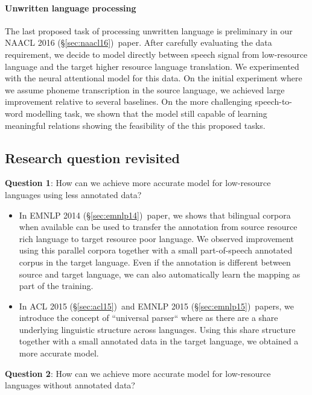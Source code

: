 \documentclass[12pt,twoside,final,hidelinks]{ltthesis}
\theoremstyle{definition}
\newcommand\emnlpiv{EMNLP 2014 (\S\ref{sec:emnlp14})}
\newcommand\aclv{ACL 2015 (\S\ref{sec:acl15})}
\newcommand\emnlpv{EMNLP 2015 (\S\ref{sec:emnlp15})}
\newcommand\naaclvi{NAACL 2016 (\S\ref{sec:naacl16})}
\begin{document}
\paragraph{Unwritten language processing}The last proposed task of processing unwritten language is preliminary in our \naaclvi\ paper. After carefully evaluating the data requirement, we decide 
to model directly between speech signal from low-resource language and the target higher resource language translation. We experimented with the neural attentional model 
for this data. On the initial experiment where we assume phoneme transcription in the source language, we achieved large improvement relative to several 
baselines. On the more challenging speech-to-word modelling task, we shown that the model still capable of learning meaningful relations showing the feasibility 
of the this proposed tasks. 

\subsection{Research question revisited}
\textbf{Question 1}: How can we achieve more accurate model for low-resource languages using less annotated data? 
\begin{itemize}
\item In \emnlpiv\ paper, we shows that bilingual corpora when available can be used to transfer the annotation from source resource rich language to target 
resource poor language. We observed improvement using this parallel corpora together with a small part-of-speech annotated corpus in the target language. Even if 
the annotation is different between source and target language, we can also automatically learn the mapping as part of the training. 
\item 	In \aclv\ and \emnlpv\ papers, we introduce the concept of ``universal parser`` where as there are a share underlying linguistic structure across languages. 
Using this share structure together with a small annotated data in the target language, we obtained a more accurate model.  
\end{itemize}

\textbf{Question 2}: How can we achieve more accurate model for low-resource languages without annotated data?
\end{document}
